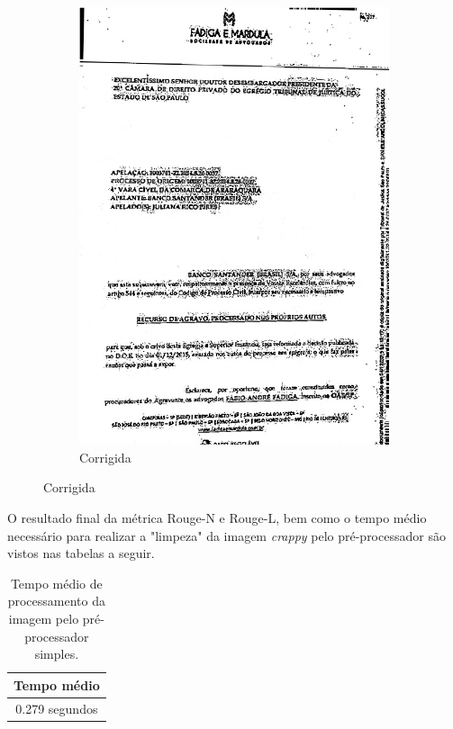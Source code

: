 \begin{figure}[H]
\begin{subfigure}[t]{.3\linewidth}
    \includegraphics[width=\textwidth]{figuras/991665_310196612_46_corrected.jpg}
    \caption{Corrigida}
  \end{subfigure}
  \label{fig:skew-corrected-image}
\end{figure}

O resultado final da métrica Rouge-N e Rouge-L, bem como o tempo médio necessário para realizar a "limpeza" da imagem \textit{crappy} pelo pré-processador são vistos nas tabelas a seguir.

\begin{table}[H]
  \centering
  \caption{Tempo médio de processamento da imagem pelo pré-processador simples.}
  \begin{tabular}{|c|}
    \hline
      \textbf{Tempo médio} \\
    \hline
      0.279 segundos \\
    \hline
  \end{tabular}
  \label{tab:pre-processor-average-time}
\end{table}

